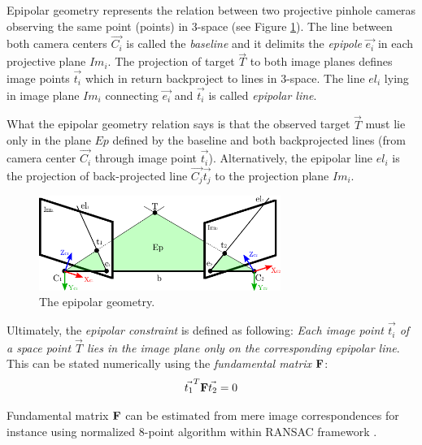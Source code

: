 Epipolar geometry represents the relation between two projective pinhole cameras observing the same point (points) in 3-space \cite{Cyganek:2007:ICV:1214366} (see Figure \ref{fig:epipolar_geometry}). The line between both camera centers $\vec{C_{i}}$ is called the \textit{baseline} and it delimits the \textit{epipole} $ \vec{e_{i}}$ in each projective plane $Im_{i}$. The projection of target $\vec{T}$ to both image planes defines image points $\vec{t_{i}}$ which in return backproject to lines in 3-space. The line $el_{i}$ lying in image plane $Im_{i}$ connecting $\vec{e_{i}}$ and ${\vec{t_{i}}}$ is called \textit{epipolar line}.

What the epipolar geometry relation says is that the observed target $\vec{T}$ must lie only in the plane $Ep$ defined by the baseline and both backprojected lines (from camera center $\vec{C_{i}}$ through image point $\vec{t_{i}}$). Alternatively, the epipolar line $el_{i}$ is the projection of back-projected line $\vec{C_{j}}\vec{t_{j}}$ to the projection plane $Im_{i}$.

\begin{figure}[tbh]
	\centering
	\includegraphics[width=0.7\textwidth]{fig/epipolar_geometry.pdf}
	\caption{The epipolar geometry.}
	\label{fig:epipolar_geometry}
\end{figure}

Ultimately, the \textit{epipolar constraint} is defined as following: \textit{Each image point $\vec{t_{i}}$ of a space point $\vec{T}$ lies in the image plane only on the corresponding epipolar line}. This can be stated numerically using the \textit{fundamental matrix} $\mathbf{F}$:
\begin{align}
	\vec{t_{1}}^{T}\mathbf{F}\vec{t_{2}} = 0
\end{align}

Fundamental matrix $\mathbf{F}$ can be estimated from mere image correspondences for instance using normalized 8-point algorithm within RANSAC framework \cite{Hartley:2003:MVG:861369, Cyganek:2007:ICV:1214366}.

